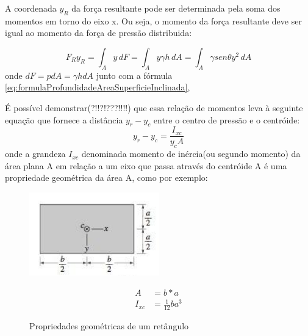 \documentclass{article}
\begin{document}
A coordenada $y_R$ da força resultante pode ser determinada pela soma dos momentos em torno do eixo x. Ou seja, o momento da força resultante deve ser igual ao momento da força de pressão distribuida:

\begin{equation}
  F_Ry_R = \int_{A}^{ } y\, dF = \int_{A}^{ } y\gamma h\, dA =\int_{A}^{ } \gamma sen\theta y^2\, dA 
  \label{eq:EqMomentoForcaResultanteIgualMomentoForcaPressao}
\end{equation}
onde $dF=pdA =\gamma h dA$ junto com a fórmula \ref{eq:formulaProfundidadeAreaSuperficieInclinada}, 

É possível demonstrar(?!!?!???!!!!) que essa relação de momentos leva à seguinte equação que fornece a distância $y_r-y_c$ entre o centro de pressão e o centróide:
\begin{equation}
  y_r - y_c = \frac{I_{xc}}{y_cA} 
  \label{eq:equacaoDistanciaCentroPressaoECentroide}
\end{equation}
onde a grandeza $I_{xc}$ denominada momento de inércia(ou segundo momento) da área plana A em relação a um eixo que passa através do centróide A é uma propriedade geométrica da área A, como por exemplo:
\begin{figure}[!h]
  \centering
  \begin{minipage}{0.45\textwidth}
    \centering
    \includegraphics[width=0.7\linewidth]{propriedadesGeometricaRetangulo.png}
    \caption{Propriedades geométricas de um retângulo}
  \end{minipage}\hfill
  \begin{minipage}{0.45\textwidth}
    \centering
    \begin{align*}
      A&=b*a\\
      I_{xc}&=\frac{1}{12}ba^3
    \end{align*}
  \end{minipage}
\end{figure}
\end{document}
